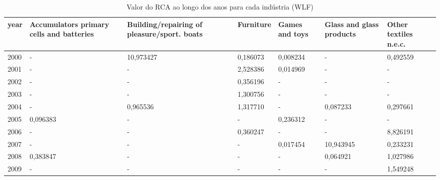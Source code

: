 \begin{table}
\centering
\caption{Valor do RCA ao longo dos anos para cada indústria (WLF)}
\begin{tabular}{p{1cm}p{2cm}p{2cm}p{2cm}p{2cm}p{2cm}p{2cm}}
\toprule
 year &  Accumulators primary cells and batteries &  Building/repairing of pleasure/sport. boats &  Furniture &  Games and toys &  Glass and glass products &  Other textiles n.e.c. \\
\midrule
 2000 &                                         - &                                    10,973427 &   0,186073 &        0,008234 &                         - &               0,492559 \\
 2001 &                                         - &                                            - &   2,528386 &        0,014969 &                         - &                      - \\
 2002 &                                         - &                                            - &   0,356196 &               - &                         - &                      - \\
 2003 &                                         - &                                            - &   1,300756 &               - &                         - &                      - \\
 2004 &                                         - &                                     0,965536 &   1,317710 &               - &                  0,087233 &               0,297661 \\
 2005 &                                  0,096383 &                                            - &          - &        0,236312 &                         - &                      - \\
 2006 &                                         - &                                            - &   0,360247 &               - &                         - &               8,826191 \\
 2007 &                                         - &                                            - &          - &        0,017454 &                 10,943945 &               0,233231 \\
 2008 &                                  0,383847 &                                            - &          - &               - &                  0,064921 &               1,027986 \\
 2009 &                                         - &                                            - &          - &               - &                         - &               1,549248 \\

\end{tabular}
\end{table}
